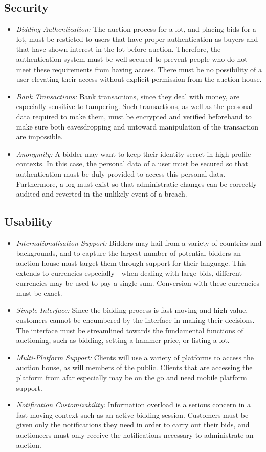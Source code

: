 \documentclass[titlepage, 12pt]{extarticle}
\begin{document}
\subsection{Security}
\begin{itemize}
\item {\it Bidding Authentication:} The auction process for a lot, and placing bids for a lot, must be resticted to users that have proper authentication as buyers and that have shown interest in the lot before auction. Therefore, the authentication system must be well secured to prevent people who do not meet these requirements from having access. There must be no possibility of a user elevating their access without explicit permission from the auction house.
\item {\it Bank Transactions:} Bank transactions, since they deal with money, are especially sensitive to tampering. Such transactions, as well as the personal data required to make them, must be encrypted and verified beforehand to make sure both eavesdropping and untoward manipulation of the transaction are impossible.
\item {\it Anonymity:} A bidder may want to keep their identity secret in high-profile contexts. In this case, the personal data of a user must be secured so that authentication must be duly provided to access this personal data. Furthermore, a log must exist so that administratie changes can be correctly audited and reverted in the unlikely event of a breach.
\end{itemize}
\subsection{Usability}
\begin{itemize}
\item {\it Internationalisation Support:} Bidders may hail from a variety of countries and backgrounds, and to capture the largest number of potential bidders an auction house must target them through support for their language. This extends to currencies especially - when dealing with large bids, different currencies may be used to pay a single sum. Conversion with these currencies must be exact.
\item {\it Simple Interface:} Since the bidding process is fast-moving and high-value, customers cannot be encumbered by the interface in making their decisions. The interface must be streamlined towards the fundamental functions of auctioning, such as bidding, setting a hammer price, or listing a lot.
\item {\it Multi-Platform Support:} Clients will use a variety of platforms to access the auction house, as will members of the public. Clients that are accessing the platform from afar especially may be on the go and need mobile platform support.
\item {\it Notification Customizability:} Information overload is a serious concern in a fast-moving context such as an active bidding session. Customers must be given only the notifications they need in order to carry out their bids, and auctioneers must only receive the notifications necessary to administrate an auction.
\end{itemize}
\end{document}
